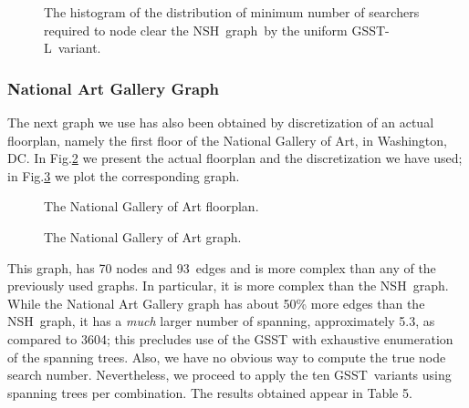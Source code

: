 \documentclass[11pt]{article}\usepackage{amsmath}
\begin{document}
\begin{figure}[h]
\centering{}\caption{The
histogram of the distribution of minimum number of searchers required to node
clear the NSH\ graph\ by the uniform GSST-L\ variant.}\label{fig10}\end{figure}

\subsubsection{National Art Gallery Graph}

The next graph we use has also been obtained by discretization of an actual
floorplan, namely the first floor of the National Gallery of Art, in
Washington, DC. In Fig.\ref{fig12} we present the actual floorplan and the
discretization we have used; in Fig.\ref{fig13} we plot the corresponding graph.

\begin{figure}[h]
\centering
{}\caption{The National Gallery
of Art floorplan.}\label{fig12}\end{figure}

\begin{figure}[h]
\centering{}\caption{The National
Gallery of Art graph.}\label{fig13}\end{figure}

\clearpage


This graph, has 70 nodes and 93\ edges and is more complex than any of the
previously used graphs. In particular, it is more complex than the NSH\ graph.
While the National Art Gallery graph has about 50\% more edges than the
NSH\ graph, it has a \emph{much }larger number of spanning, approximately
5.3, as compared to 3604; this precludes use of the GSST with
exhaustive enumeration of the spanning trees. Also, we have no obvious way to
compute the true node search number. Nevertheless, we proceed to apply the ten
GSST\ variants using  spanning trees per combination. The
results obtained appear in Table 5.
\end{document}
